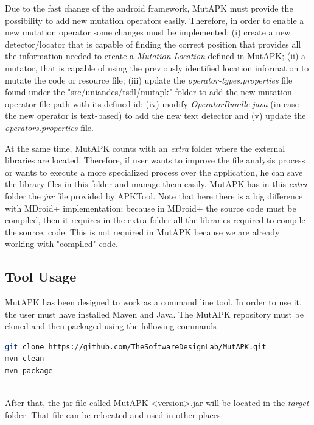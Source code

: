 Due to the fast change of the android framework, MutAPK must provide the possibility to add new mutation operators easily. Therefore, in order to enable a new mutation operator some changes must be implemented: (i) create a new detector/locator that is capable of finding the correct position that provides all the information needed to create a \textit{Mutation Location} defined in MutAPK; (ii) a mutator, that is capable of using the previously identified location information to mutate the code or resource file; (iii) update the \textit{operator-types.properties} file found under the "src/uniandes/tsdl/mutapk" folder to add the new mutation operator file path with its defined id; (iv) modify \textit{OperatorBundle.java} (in case the new operator is text-based) to add the new text detector and (v) update the \textit{operators.properties} file.

At the same time, MutAPK counts with an \textit{extra} folder where the external libraries are located. Therefore, if user wants to improve the file analysis process or wants to execute a more specialized process over the application, he can save the library files in this folder and manage them easily. MutAPK has in this \textit{extra} folder the \textit{jar} file provided by APKTool. Note that here there is a big difference with MDroid+ implementation; because in MDroid+ the source code must be compiled, then it requires in the extra folder all the libraries required to compile the source, code. This is not required in MutAPK because we are already working with "compiled" code.
\subsection{Tool Usage}
MutAPK has been designed to work as a command line tool. In order to use it, the user must have installed Maven and Java. The MutAPK repository\cite{MutAPK} must be cloned and then packaged using the following commands

\begin{minipage}{\linewidth}
	\begin{lstlisting}[language={sh}, label={lst:mvn}, caption={Git and Maven commands to build MutAPK}, numbers=none]
git clone https://github.com/TheSoftwareDesignLab/MutAPK.git
mvn clean
mvn package
	\end{lstlisting}
\end{minipage}\\

After that, the  jar file called MutAPK-<version>.jar will be located in the \textit{target} folder. That file can be relocated and used in other places. 

